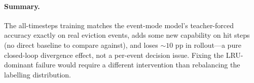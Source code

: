 \documentclass{article}
\begin{document}
\paragraph{Summary.} The all-timesteps training matches the event-mode
model's teacher-forced accuracy exactly on real eviction events, adds some
new capability on hit steps (no direct baseline to compare against), and
loses ${\sim}10$ pp in rollout---a pure closed-loop divergence effect, not a
per-event decision issue. Fixing the LRU-dominant failure would require a
different intervention than rebalancing the labelling distribution.
\end{document}
